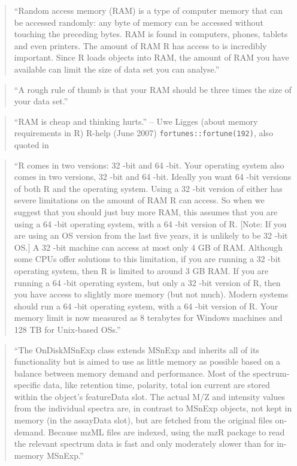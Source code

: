 \documentclass[]{tufte-book}
\begin{document}
\begin{quote}
``Random access memory (RAM) is a type of computer memory that can be accessed
randomly: any byte of memory can be accessed without touching the preceding
bytes. RAM is found in computers, phones, tablets and even printers. The amount
of RAM R has access to is incredibly important. Since R loads objects into RAM,
the amount of RAM you have available can limit the size of data set you can
analyse.'' \citep{gillespie2016efficient}
\end{quote}

\begin{quote}
``A rough rule of thumb is that your RAM should be three times the size of your
data set.'' \citep{gillespie2016efficient}
\end{quote}

\begin{quote}
``RAM is cheap and thinking hurts.'' -- Uwe Ligges (about memory requirements in
R) R-help (June 2007) \texttt{fortunes::fortune(192)}, also quoted in
\citep{gillespie2016efficient}
\end{quote}

\begin{quote}
``R comes in two versions: 32 -bit and 64 -bit. Your operating system also
comes in two versions, 32 -bit and 64 -bit. Ideally you want 64 -bit versions of
both R and the operating system. Using a 32 -bit version of either has severe
limitations on the amount of RAM R can access. So when we suggest that you
should just buy more RAM, this assumes that you are using a 64 -bit operating
system, with a 64 -bit version of R. {[}Note: If you are using an OS version from
the last five years, it is unlikely to be 32 -bit OS.{]} A 32 -bit machine can
access at most only 4 GB of RAM. Although some CPUs offer solutions to this
limitation, if you are running a 32 -bit operating system, then R is limited to
around 3 GB RAM. If you are running a 64 -bit operating system, but only a 32
-bit version of R, then you have access to slightly more memory (but not much).
Modern systems should run a 64 -bit operating system, with a 64 -bit version of
R. Your memory limit is now measured as 8 terabytes for Windows machines and 128
TB for Unix-based OSs.'' \citep{gillespie2016efficient}
\end{quote}

\begin{quote}
``The OnDiskMSnExp class extends MSnExp and inherits all of its functionality
but is aimed to use as little memory as possible based on a balance between
memory demand and performance. Most of the spectrum-specific data, like
retention time, polarity, total ion current are stored within the object's
featureData slot. The actual M/Z and intensity values from the individual
spectra are, in contrast to MSnExp objects, not kept in memory (in the assayData
slot), but are fetched from the original files on-demand. Because mzML files are
indexed, using the mzR package to read the relevant spectrum data is fast and
only moderately slower than for in-memory MSnExp.'' \citep{gatto2013msnbase}
\end{quote}
\end{document}
